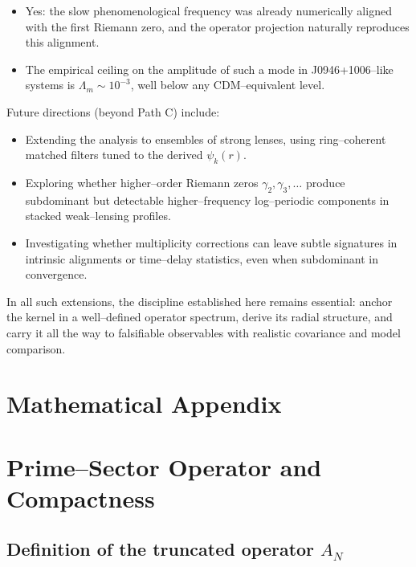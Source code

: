 \documentclass[11pt]{article}
\begin{document}
\begin{itemize}[leftmargin=*]
  \item Yes: the slow phenomenological frequency was already numerically aligned with the first Riemann zero, and the operator projection naturally reproduces this alignment.

  \item The empirical ceiling on the amplitude of such a mode in J0946+1006--like systems is $\Lambda_m \sim 10^{-3}$, well below any CDM--equivalent level.

\end{itemize}

Future directions (beyond Path C) include:

\begin{itemize}[leftmargin=*]
  \item Extending the analysis to ensembles of strong lenses, using ring--coherent matched filters tuned to the derived $\psi_k(r)$.
  \item Exploring whether higher--order Riemann zeros $\gamma_2,\gamma_3,\dots$ produce subdominant but detectable higher--frequency log--periodic components in stacked weak--lensing profiles.
  \item Investigating whether multiplicity corrections can leave subtle signatures in intrinsic alignments or time--delay statistics, even when subdominant in convergence.

\end{itemize}

In all such extensions, the discipline established here remains essential: anchor the kernel in a well--defined operator spectrum, derive its radial structure, and carry it all the way to falsifiable observables with realistic covariance and model comparison.

\appendix

\section*{Mathematical Appendix}

\section{Prime--Sector Operator and Compactness}

\subsection{Definition of the truncated operator $A_N$}
\end{document}
